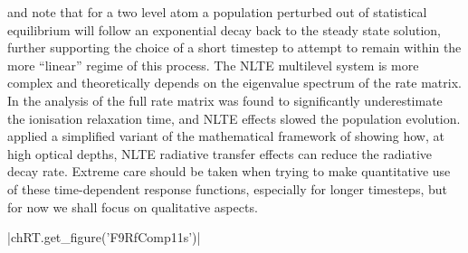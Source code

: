 \citet{Carlsson2002} and \citet{Judge2005} note that for a two level atom a population perturbed out of statistical equilibrium will follow an exponential decay back to the steady state solution, further supporting the choice of a short timestep to attempt to remain within the more ``linear'' regime of this process.
The NLTE multilevel system is more complex and theoretically depends on the eigenvalue spectrum of the rate matrix.
In the analysis of \citet{Carlsson2002} the full rate matrix was found to significantly underestimate the ionisation relaxation time, and NLTE effects slowed the population evolution.
\citet{Judge2005} applied a simplified variant of the mathematical framework of \citet{Gayley1990} showing how, at high optical depths, NLTE radiative transfer effects can reduce the radiative decay rate.
Extreme care should be taken when trying to make quantitative use of these time-dependent response functions, especially for longer timesteps, but for now we shall focus on qualitative aspects.

\py[TimeDepRT]|chRT.get_figure('F9RfComp11s')|

